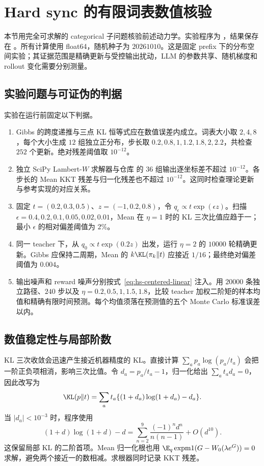 \section{Hard sync 的有限词表数值核验}
\label{sec:hard-sync-experiments}

本节用完全可求解的 categorical 子问题核验前述动力学。实验程序为 ，结果保存在 。所有计算使用 float64，随机种子为 $20261010$。这是固定 prefix 下的分布空间实验；其证据范围是精确更新与受控输出扰动，LLM 的参数共享、随机梯度和 rollout 变化需要分别测量。

\subsection{实验问题与可证伪的判据}

实验在运行前固定以下判据。
\begin{enumerate}
 \item Gibbs 的跨度递推与三点 KL 恒等式应在数值误差内成立。词表大小取 $2,4,8$，每个大小生成 $12$ 组独立正分布，步长取 $0.2,0.8,1,1.2,1.8,2,2.2$，共检查 $252$ 个更新。绝对残差阈值取 $10^{-12}$。
 \item 独立 SciPy Lambert-$W$ 求解器与仓库  的 $36$ 组输出逐坐标差不超过 $10^{-12}$。各步长的 Mean KKT 残差与归一化残差也不超过 $10^{-12}$。这同时检查理论更新与参考实现的对应关系。
 \item 固定 $t=(0.2,0.3,0.5)$、$z=(-1,0.2,0.8)$，令 $q_\epsilon\propto t\exp(\epsilon z)$。扫描 $\epsilon=0.4,0.2,0.1,0.05,0.02,0.01$，Mean 在 $\eta=1$ 时的 KL 三次比值应趋于一；最小 $\epsilon$ 的相对偏差阈值为 $2\%$。
 \item 同一 teacher 下，从 $q_0\propto t\exp(0.2z)$ 出发，运行 $\eta=2$ 的 $10000$ 轮精确更新。Gibbs 应保持二周期，Mean 的 $k\KL(\pi_k\Vert t)$ 应接近 $1/16$；最终绝对偏差阈值为 $0.004$。
 \item 输出噪声和 reward 噪声分别按式~\eqref{eq:hs-centered-linear} 注入。用 $20000$ 条独立路径、$240$ 步以及 $\eta=0.2,0.5,1,1.5,1.8$，比较 teacher 加权二阶矩的样本均值和精确有限时间预测。每个均值须落在预测值的五个 Monte Carlo 标准误差以内。
\end{enumerate}

\subsection{数值稳定性与局部阶数}

KL 三次收敛会迅速产生接近机器精度的 KL。直接计算 $\sum_a p_a\log(p_a/t_a)$ 会把一阶正负项相消，影响三次比值。令 $d_a=p_a/t_a-1$，归一化给出 $\sum_a t_ad_a=0$，因此改写为
\[
 \KL(p\Vert t)=\sum_a t_a\{(1+d_a)\log(1+d_a)-d_a\}.
\]
当 $|d_a|<10^{-3}$ 时，程序使用
\[
 (1+d)\log(1+d)-d
 =\sum_{n=2}^{9}\frac{(-1)^n d^n}{n(n-1)}+O(d^{10}).
\]
这保留局部 KL 的二阶首项。Mean 归一化根也用 $\E_q\operatorname{expm1}(G-W_0(\lambda e^G))=0$ 求解，避免两个接近一的数相减。求根器同时记录 KKT 残差。

